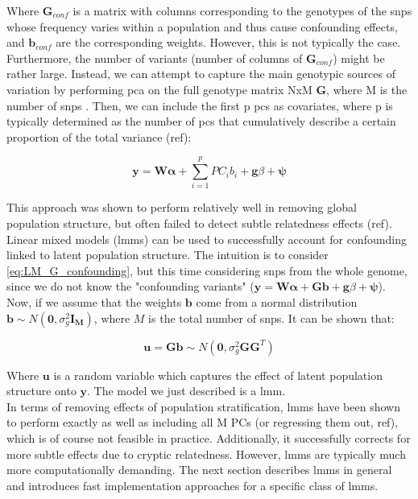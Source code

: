 Where $\mathbf{G}_{conf}$ is a matrix with columns corresponding to the genotypes of the \gls{snps} whose frequency varies within a population and thus cause confounding effects, and $\mathbf{b}_{conf}$ are the corresponding weights. 
However, this is not typically the case.
Furthermore, the number of variants (number of columns of $\mathbf{G}_{conf}$) might be rather large.
Instead, we can attempt to capture the main genotypic sources of variation by performing \gls{pca} on the full genotype matrix NxM $\mathbf{G}$, where M is the number of \gls{snps} \cite{price2006principal}.
Then, we can include the first p \gls{pc}s as covariates, where p is typically determined as the number of \gls{pc}s that cumulatively describe a certain proportion of the total variance (ref):

\begin{equation}\label{eq:LM_PC_confounding}
    \mathbf{y} =  \mathbf{W}\boldsymbol{\alpha} + \sum_{i=1}^{p} PC_i b_i + \mathbf{g}\beta + \boldsymbol{\psi} 
\end{equation}

This approach was shown to perform relatively well in removing global population structure, but often failed to detect subtle relatedness effects (ref).\\

Linear mixed models (\gls{lmm}s) can be used to successfully account for confounding linked to latent population structure.
The intuition is to consider \eqref{eq:LM_G_confounding}, but this time considering \gls{snps} from the whole genome, since we do not know the "confounding variants" ($\mathbf{y} =  \mathbf{W}\boldsymbol{\alpha} +  \mathbf{G}\mathbf{b} + \mathbf{g}\beta + \boldsymbol{\psi}$).
Now, if we assume that the weights $\mathbf{b}$ come from a normal distribution $\mathbf{b} \sim N(\mathbf{0},\sigma^2_g\mathbf{I_M})$, where $M$ is the total number of \gls{snps}.
It can be shown that:

\begin{equation}\label{eq:LMM_G_confounding}
    \mathbf{u} =  \mathbf{G}\mathbf{b} \sim N(\mathbf{0},\sigma^2_g \mathbf{G}\mathbf{G}^T)
\end{equation}

Where $\mathbf{u}$ is a random variable which captures the effect of latent population structure onto $\mathbf{y}$.
The model we just described is a \gls{lmm}.\\

In terms of removing effects of population stratification, \gls{lmm}s have been shown to perform exactly as well as  including all M PCs (or regressing them out, ref), which is of course not feasible in practice.
Additionally, it successfully corrects for more subtle effects due to cryptic relatedness.
However, \gls{lmm}s are typically much more computationally demanding.
The next section describes \gls{lmm}s in general and introduces fast implementation approaches for a specific class of \gls{lmm}s.

